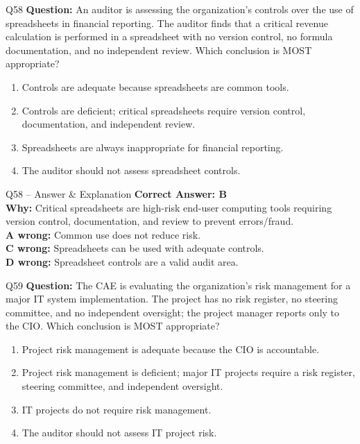 \documentclass[aspectratio=169,10pt]{beamer}
\begin{document}
	\begin{frame}[t]{Q58}
		\small
		\textbf{Question:} An auditor is assessing the organization's controls over the use of spreadsheets in financial reporting. The auditor finds that a critical revenue calculation is performed in a spreadsheet with no version control, no formula documentation, and no independent review. Which conclusion is MOST appropriate?
		\begin{enumerate}[label=\Alph*.,itemsep=1pt,topsep=2pt]
			\item Controls are adequate because spreadsheets are common tools.
			\item Controls are deficient; critical spreadsheets require version control, documentation, and independent review.
			\item Spreadsheets are always inappropriate for financial reporting.
			\item The auditor should not assess spreadsheet controls.
		\end{enumerate}
	\end{frame}
	
	\begin{frame}[t]{Q58 -- Answer \& Explanation}
		\small
		\textbf{Correct Answer: B} \\[4pt]
		\textbf{Why:} Critical spreadsheets are high-risk end-user computing tools requiring version control, documentation, and review to prevent errors/fraud. \\[4pt]
		\textbf{A wrong:} Common use does not reduce risk. \\[2pt]
		\textbf{C wrong:} Spreadsheets can be used with adequate controls. \\[2pt]
		\textbf{D wrong:} Spreadsheet controls are a valid audit area.
	\end{frame}
	
	\begin{frame}[t]{Q59}
		\small
		\textbf{Question:} The CAE is evaluating the organization's risk management for a major IT system implementation. The project has no risk register, no steering committee, and no independent oversight; the project manager reports only to the CIO. Which conclusion is MOST appropriate?
		\begin{enumerate}[label=\Alph*.,itemsep=1pt,topsep=2pt]
			\item Project risk management is adequate because the CIO is accountable.
			\item Project risk management is deficient; major IT projects require a risk register, steering committee, and independent oversight.
			\item IT projects do not require risk management.
			\item The auditor should not assess IT project risk.
		\end{enumerate}
	\end{frame}
	
\end{document}
